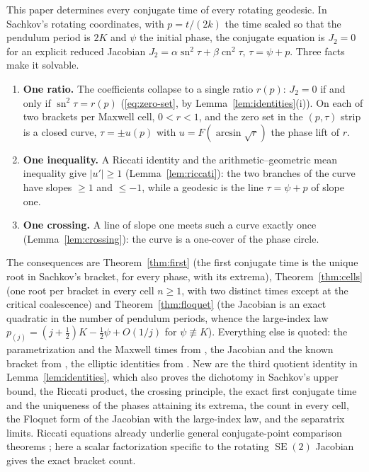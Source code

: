 \documentclass[11pt]{article}
\theoremstyle{remark}
\newcommand{\SE}{\operatorname{SE}(2)}
\newcommand{\sn}{\operatorname{sn}}
\newcommand{\cn}{\operatorname{cn}}
\begin{document}
This paper determines every conjugate time of every rotating geodesic.  In
Sachkov's rotating coordinates, with $p=t/(2k)$ the time scaled so that
the pendulum period is $2K$ and $\psi$ the initial phase, the conjugate
equation is $J_2=0$ for an explicit reduced Jacobian
$J_2=\alpha\sn^2\tau+\beta\cn^2\tau$, $\tau=\psi+p$.  Three facts make it
solvable.
\begin{enumerate}[nosep,leftmargin=*]
\item \textbf{One ratio.}  The coefficients collapse to a single
      ratio $r(p)$: $J_2=0$ if and only if $\sn^2\tau=r(p)$
      (\eqref{eq:zero-set}, by Lemma~\ref{lem:identities}(i)).  On each of two brackets per Maxwell
      cell, $0<r<1$, and the zero set in the $(p,\tau)$ strip is a closed
      curve, $\tau=\pm u(p)$ with $u=F(\arcsin\sqrt r)$ the phase lift of $r$.
\item \textbf{One inequality.}  A Riccati identity and the
      arithmetic--geometric mean inequality give $|u'|\ge1$
      (Lemma~\ref{lem:riccati}): the two branches of the curve have slopes
      $\ge1$ and $\le-1$, while a geodesic is the line $\tau=\psi+p$ of slope
      one.
\item \textbf{One crossing.}  A line of slope one meets such a curve exactly
      once (Lemma~\ref{lem:crossing}): the curve is a one-cover of the
      phase circle.
\end{enumerate}
The consequences are Theorem~\ref{thm:first} (the first conjugate time is
the unique root in Sachkov's bracket, for every phase, with its extrema),
Theorem~\ref{thm:cells} (one root per bracket in every cell $n\ge1$,
with two distinct times except at the critical coalescence) and
Theorem~\ref{thm:floquet} (the Jacobian is an exact quadratic in the number
of pendulum periods, whence the large-index law
$p_{(j)}=(j+\tfrac12)K-\tfrac12\psi+O(1/j)$ for $\psi\not\equiv K$).  Everything else is quoted:
the parametrization and the Maxwell times from
\cite{MoiseevSachkov2010Maxwell}, the Jacobian and the known bracket from
\cite{Sachkov2010Conjugate}, the elliptic identities from \cite{DLMF}.
New are the third quotient identity in Lemma~\ref{lem:identities}, which
also proves the dichotomy in Sachkov's upper bound, the Riccati product,
the crossing principle, the exact first conjugate time and the uniqueness
of the phases attaining its extrema, the count in every cell, the Floquet
form of the Jacobian with the large-index law, and the separatrix limits.
Riccati equations already underlie general conjugate-point comparison
theorems \cite{BarilariRizzi2016Comparison}; here a scalar factorization
specific to the rotating $\SE$ Jacobian gives the exact bracket count.
\end{document}
